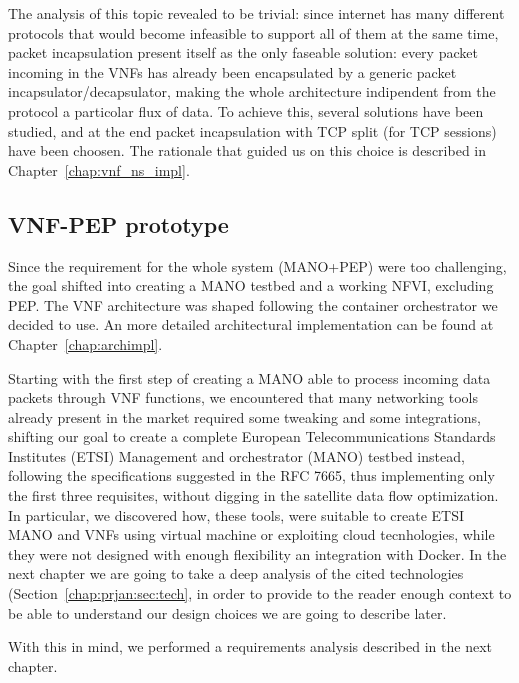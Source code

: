 The analysis of this topic revealed to be trivial: since internet has many
different protocols that would become infeasible to support all of them at the
same time, packet incapsulation present itself as the only faseable solution:
every packet incoming in the VNFs has already been encapsulated by a generic
packet incapsulator/decapsulator,
 making the whole architecture 
indipendent from the protocol a particolar flux of data. To achieve this, 
several solutions have been studied, and at the end packet incapsulation with 
TCP split (for TCP sessions) have been choosen. The rationale that guided us on 
this choice is described in Chapter~\ref{chap:vnf_ns_impl}. 

\subsection{VNF-PEP prototype}

Since the requirement for the whole system (MANO+PEP) were too challenging, the 
goal shifted into creating a MANO testbed and a working NFVI, excluding PEP. 
The VNF architecture was shaped following the container orchestrator we decided 
to use. An more detailed architectural implementation can be found at 
Chapter~\ref{chap:archimpl}.


\vspace{0.5cm}

Starting with the first step of creating a MANO able to process incoming data
packets through VNF functions, we encountered that many networking tools already
present in the market required some tweaking and some integrations, shifting our
goal to create a complete European Telecommunications Standards Institutes
(ETSI) Management and orchestrator (MANO) testbed instead, following the
specifications suggested in the RFC 7665, thus implementing only the first three
requisites, without digging in the satellite data flow optimization. In
particular, we discovered how, these tools, were suitable to create ETSI MANO
and VNFs using virtual machine or exploiting cloud tecnhologies, while they were
not designed with enough flexibility an integration with Docker. In the next
chapter we are going to take a deep analysis of the cited technologies 
(Section~\ref{chap:prjan:sec:tech}, in order to provide to the reader enough 
context to be able to understand our design choices we are going to describe 
later.

\noindent With this in mind, we performed a requirements analysis described in
the next chapter.
 
